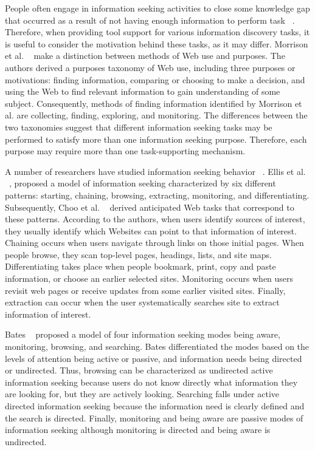 \documentclass{casconpaper}
\begin{document}
{People often engage in information seeking activities to close some knowledge gap that occurred as a result of not having enough information to perform task ~\cite{proper}. Therefore, when providing tool support for various information discovery tasks, it is useful to consider the motivation behind these tasks, as it may differ. Morrison et al. ~\cite{morrison} make a distinction between methods of Web use and purposes. The authors derived a purposes taxonomy of Web use, including three purposes or motivations: finding information, comparing or choosing to make a decision, and using the Web to find relevant information to gain understanding of some subject. Consequently, methods of finding information identified by Morrison et al. are collecting, finding, exploring, and monitoring. The differences between the two taxonomies suggest that different information seeking tasks may be performed to satisfy more than one information seeking purpose. Therefore, each purpose may require more than one task-supporting mechanism. 

A number of researchers have studied information seeking behavior ~\cite{bates2002, bates1986, choo, ellis1989, ellis1997, ellis1993}. Ellis et al. ~\cite{ellis1989, ellis1997, ellis1993}, proposed a model of information seeking characterized by six different patterns: starting, chaining, browsing, extracting, monitoring, and differentiating. Subsequently, Choo et al. ~\cite{choo} derived anticipated Web tasks that correspond to these patterns. According to the authors, when users identify sources of interest, they usually identify which Websites can point to that information of interest.  Chaining occurs when users navigate through links on those initial pages. When people browse, they scan top-level pages, headings, lists, and site maps. Differentiating takes place when people bookmark, print, copy and paste information, or choose an earlier selected sites. Monitoring occurs when users revisit web pages or receive updates from some earlier visited sites. Finally, extraction can occur when the user systematically searches site to extract information of interest. 

Bates ~\cite{bates1986} proposed a model of four information seeking modes being aware, monitoring, browsing, and searching. Bates differentiated the modes based on the levels of attention being active or passive, and information needs being directed or undirected. Thus, browsing can be characterized as undirected active information seeking because users do not know directly what information they are looking for, but they are actively looking. Searching falls under active directed information seeking because the information need is clearly defined and the search is directed. Finally, monitoring and being aware are passive modes of information seeking although monitoring is directed and being aware is undirected.   

}
\end{document}
